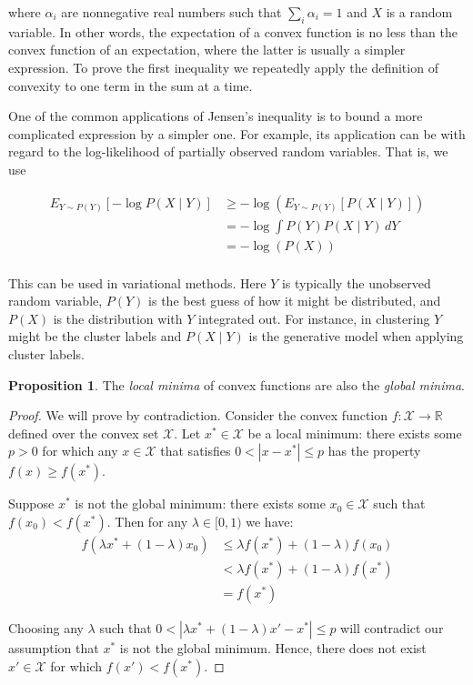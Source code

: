 \documentclass[a4paper,12pt]{article}
\theoremstyle{definition}
\newtheorem*{proposition}{Proposition}
\newcommand{\R}{\mathbb{R}}
\begin{document}
where $\alpha_i$ are nonnegative real numbers such that $\sum_i \alpha_i = 1$ and $X$ is
a random variable. In other words, the expectation of a convex function is no less than
the convex function of an expectation, where the latter is usually a simpler expression.
To prove the first inequality we repeatedly apply the definition of convexity to one term
in the sum at a time.

One of the common applications of Jensen's inequality is to bound a more complicated
expression by a simpler one. For example, its application can be with regard to the
log-likelihood of partially observed random variables. That is, we use


\begin{align*}
    E_{Y \sim P(Y)}[-\log P(X \mid Y)] & \geq -\log(E_{Y \sim P(Y)}[P(X \mid Y)]) \\
                                       & = -\log \int P(Y) P(X \mid Y) \,dY       \\
                                       & = -\log(P(X))                            \\
\end{align*}

This can be used in variational methods. Here $Y$ is typically the unobserved random variable, $P(Y)$ is the best guess of how it might be distributed, and $P(X)$
is the distribution with $Y$ integrated out. For instance, in clustering $Y$ might be the cluster labels and $P(X \mid Y)$ is the generative model when applying cluster labels.

\begin{proposition}
    The \emph{local minima} of convex functions are also the \emph{global minima}.
    \begin{proof}
        We will prove by contradiction.
        Consider the convex function $f: \mathcal{X} \to \R$ defined over the convex set $\mathcal{X}$.
        Let $x^{\ast} \in \mathcal{X}$ be a local minimum: there exists some $p > 0$ for which any
        $x \in \mathcal{X}$ that satisfies $0 < |x - x^{\ast}| \leq p$ has the property $f(x) \geq f(x^*)$.

        Suppose $x^{\ast}$ is not the global minimum: there exists some $x_0 \in \mathcal{X}$ such that
        $f(x_0) < f(x^{\ast})$.
        Then for any $\lambda \in [0, 1)$ we have:
        \begin{align*}
            f(\lambda x^\ast+ (1- \lambda)x_0) & \leq \lambda f(x^\ast)+(1-\lambda)f(x_0) \\
                                & < \lambda f(x^\ast)+(1-\lambda)f(x^\ast) \\
                                & = f(x^\ast)
        \end{align*}

        Choosing any $\lambda$ such that $0 < |\lambda x^{\ast} + (1-\lambda) x' - x^{\ast}| \leq p$ will contradict 
        our assumption that $x^{\ast}$ is not the global minimum. Hence, there does not exist $x' \in \mathcal{X}$ for
        which $f(x') < f(x^{\ast})$.
    \end{proof}
\end{proposition}
\end{document}
